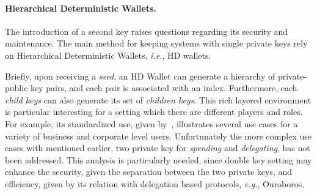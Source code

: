 \paragraph{Hierarchical Deterministic Wallets.} The introduction of a second key raises questions regarding its security and maintenance. The main method for keeping systems with single private keys rely on Hierarchical Deterministic  Wallets, \textit{i.e.}, HD wallets. 

Briefly, upon receiving a \textit{seed}, an HD Wallet can generate a hierarchy of private-public key pairs, and each pair is associated with an index. Furthermore, each \textit{child keys} can also generate its set of \textit{children keys}. This rich layered environment is particular interesting for a setting which there are different players and roles. For example, its standardized use, given by~\cite{bip32}, illustrates several use cases for a variety of business and corporate level users. Unfortunately  the more complex use cases with mentioned earlier, two private key for \textit{spending} and \textit{delegating}, has not been addressed. This analysis is particularly needed, since double key setting may enhance the security, given the separation between the two private keys, and efficiency, given by its relation with delegation based protocols, \textit{e.g.}, Ouroboros.